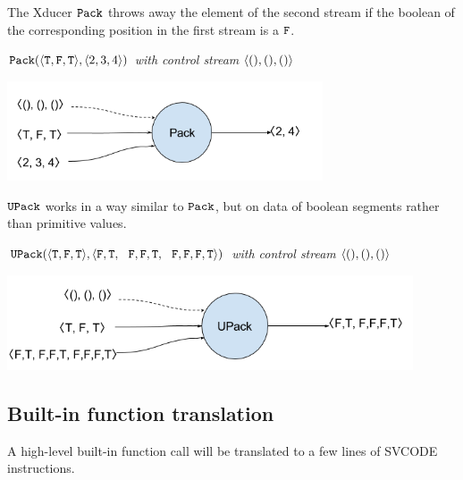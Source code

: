 The Xducer $\mathtt{Pack}$ throws away the element of the second stream if the boolean of the corresponding position in the first stream is a $\mathtt{F}$. 

\begin{example} \emph{$\pack({\<\T,\F,\T\'>}, \<2,3,4 \'>)$ with control stream $\< (),(), () \'>$}\\
	\begin{center}
		\includegraphics[width=0.7\textwidth]{fig/packxducer.png}
	\end{center}
\end{example}

$\mathtt{UPack}$ works in a way similar to $\mathtt{Pack}$, but on data of boolean segments rather than primitive values.
\begin{example} \emph{$\upack({\<\T,\F,\T\'>}, \< \F,\T,\ \ \F,\F,\T, \ \ \F,\F,\F, \T\'>)$ with control stream $\< (),(), () \'>$}\\
	\begin{center}
		\includegraphics[width=0.9\textwidth]{fig/upackxducer.png}
	\end{center}
\end{example}


\subsection{Built-in function translation}
A high-level built-in function call will be translated to a few lines of SVCODE instructions.

